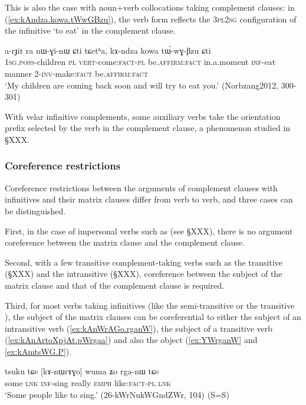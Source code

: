   This is also the case with noun+verb collocations taking complement clauses: in (\ref{ex:kAndza.kowa.tWwGBzu}), the verb form  reflects the \textsc{3pl}\fl{}\textsc{2sg} configuration of the infinitive  `to eat' in the complement clause. 
  
  \begin{exe}
\ex \label{ex:kAndza.kowa.tWwGBzu}
\gll   a-rɟit ra nɯ-ɣi-nɯ ɕti tɕetʰa, kɤ-ndza kowa tɯ́-wɣ-βzu ɕti \\
 \textsc{1sg}.\textsc{poss}-children \textsc{pl} \textsc{vert}-come:\textsc{fact}-\textsc{pl} be.\textsc{affirm}:\textsc{fact} in.a.moment \textsc{inf}-eat manner 2-\textsc{inv}-make:\textsc{fact}  be.\textsc{affirm}:\textsc{fact} \\
 \glt `My children are coming back soon and will try to eat you.' (Norbzang2012, 300-301)
 \end{exe} 
 
With velar infinitive complements, some auxiliary verbs take the orientation prefix selected by the verb in the complement clause, a phenomenon studied in §XXX.
 
\subsubsection{Coreference restrictions} \label{sec:velar.inf.coreference}
Coreference restrictions between the arguments of complement clauses with  infinitives and their matrix clauses differ from verb to verb, and three cases can be distinguished.

First, in the case of impersonal verbs such as  (see §XXX), there is no argument coreference between the matrix clause and the complement clause.

Second, with a few transitive complement-taking verbs such as the transitive  (§XXX) and the intransitive  (§XXX), coreference between the subject of the matrix clause and that of the complement clause is required.

Third, for most verbs taking infinitives (like the semi-transitive  or the transitive ),  the subject of the matrix clauses can be coreferential to either the subject of an intransitive verb (\ref{ex:kAnWrAGo.rganW}), the subject of a transitive verb (\ref{ex:kAnArtoXpjAt.pWrgaa}) and also the object (\ref{ex:YWrganW} and \ref{ex:kAmtsWG.P}).

 \begin{exe}
   \ex   \label{ex:kAnWrAGo.rganW} 
\gll tsuku tɕe [kɤ-nɯrɤɣo] wuma ʑo rga-nɯ tɕe \\
some \textsc{lnk} \textsc{inf}-sing really \textsc{emph} like:\textsc{fact-pl}  \textsc{lnk} \\
\glt `Some people like to sing.' (26-kWrNukWGndZWr, 104)  (S=S)
\end{exe}  
 
